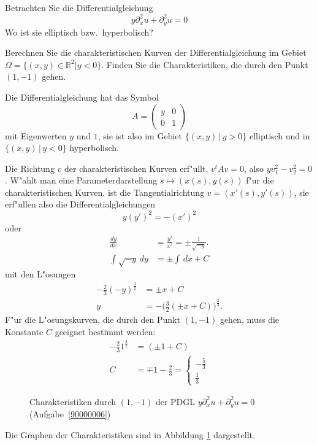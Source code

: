 Betrachten Sie die Differentialgleichung
\[
y\partial_x^2u+\partial_y^2u=0
\]
Wo ist sie elliptisch bzw.~hyperbolisch?

Berechnen Sie die charakteristischen Kurven der Differentialgleichung
im Gebiet $\Omega=\{(x,y)\in\mathbb R^2|y<0\}$.
Finden Sie die Charakteristiken, die durch den Punkt
$(1,-1)$ gehen.

\begin{loesung}
Die Differentialgleichung hat das Symbol
\[
A=\begin{pmatrix}y&0\\0&1\end{pmatrix}
\]
mit Eigenwerten $y$ und $1$, sie ist also im Gebiet $\{(x,y)\,|\,y>0\}$
elliptisch und in $\{(x,y)\,|\,y<0\}$ hyperbolisch.

Die Richtung $v$ der charakteristischen Kurven erf"ullt,
$v^tAv=0$, also $yv_1^2-v_2^2=0$. W"ahlt man eine
Parameterdarstellung $s\mapsto(x(s),y(s))$ f"ur die
charakteristischen Kurven, ist die Tangentialrichtung
$v=(x'(s),y'(s))$,
sie erf"ullen also
die Differentialgleichungen
\[
y(y')^2=-(x')^2
\]
oder
\begin{align*}
\frac{dy}{dx}&=\frac{y'}{x'}=\pm\frac1{\sqrt{-y}}.
\\
\int\sqrt{-y}\,dy&=\pm\int \,dx+C
\end{align*}
mit den L"osungen
\begin{align*}
-\frac23(-y)^{\frac32}&=\pm x+C
\\
y&=-\biggl(\frac32(\pm x+C)\biggr)^{\frac23}.
\end{align*}
F"ur die L"osungskurven, die durch den Punkt $(1,-1)$ gehen,
muss die Konstante $C$ geeignet bestimmt werden:
\begin{align*}
-\frac231^{\frac32}&=(\pm1+C)\\
C&=\mp 1-\frac23
=\begin{cases}
-\frac53\\
\frac13
\end{cases}
\end{align*}
\begin{figure}
\begin{center}
\end{center}
\caption{Charakteristiken durch $(1,-1)$ der PDGL $y\partial_x^2u+\partial_y^2u=0$ (Aufgabe~\ref{90000006})
\label{90000006:char}}
\end{figure}
Die Graphen der Charakteristiken sind in Abbildung \ref{90000006:char}
dargestellt.
\end{loesung}
